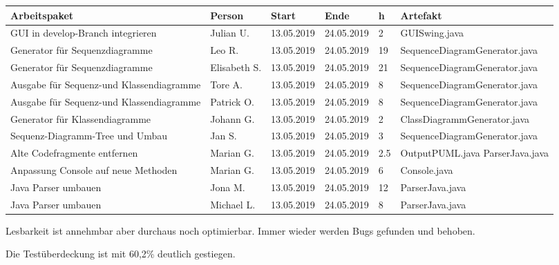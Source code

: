 \begin{longtable}{|p{4cm}|l|l|l|l|l|}
        \hline
        Arbeitspaket & Person & Start & Ende & h & Artefakt\\
        \hline
        GUI in develop-Branch integrieren & Julian U. & 13.05.2019 & 24.05.2019 & 2 & GUISwing.java \\ \hline
        Generator für Sequenzdiagramme & Leo R. & 13.05.2019 & 24.05.2019 & 19 & SequenceDiagramGenerator.java\\ \hline
        Generator für Sequenzdiagramme & Elisabeth S. & 13.05.2019 & 24.05.2019  & 21 & SequenceDiagramGenerator.java \\ \hline
        Ausgabe für Sequenz-und Klassendiagramme & Tore A.  & 13.05.2019 & 24.05.2019  & 8  & SequenceDiagramGenerator.java \\ \hline
        Ausgabe für Sequenz-und Klassendiagramme & Patrick O.  & 13.05.2019 & 24.05.2019  & 8  & SequenceDiagramGenerator.java \\ \hline
        Generator für Klassendiagramme & Johann G.  & 13.05.2019 & 24.05.2019  & 2 & ClassDiagrammGenerator.java \\ \hline
        Sequenz-Diagramm-Tree und Umbau & Jan S. & 13.05.2019 & 24.05.2019 & 3 & SequenceDiagramGenerator.java \\ \hline
        Alte Codefragmente entfernen  & Marian G. & 13.05.2019 & 24.05.2019 & 2.5 & OutputPUML.java ParserJava.java\\ \hline
        Anpassung Console auf neue Methoden & Marian G. & 13.05.2019 & 24.05.2019  & 6  & Console.java \\ \hline
        Java Parser umbauen & Jona M. & 13.05.2019 & 24.05.2019 & 12 & ParserJava.java \\ \hline
        Java Parser umbauen & Michael L. & 13.05.2019 & 24.05.2019 & 8 & ParserJava.java \\ \hline

\end{longtable}     
\nsecend

Lesbarkeit ist annehmbar aber durchaus noch optimierbar. Immer wieder werden Bugs gefunden und behoben.
\nsecend%

Die Testüberdeckung ist mit 60,2\% deutlich gestiegen.
\nsecend%


